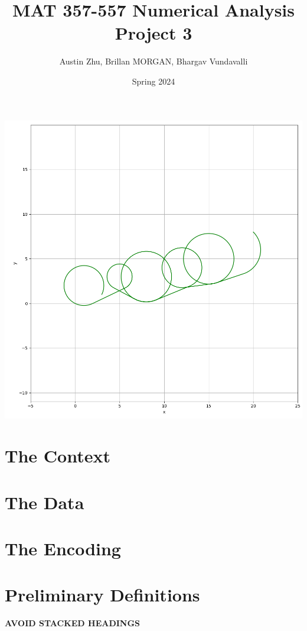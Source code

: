 \documentclass{article}
\title{MAT 357-557 Numerical Analysis Project 3}
\author{Austin Zhu, Brillan MORGAN, Bhargav Vundavalli}
\date{Spring 2024}
\begin{document}
\maketitle

\begin{center}
\includegraphics[width=1.0\linewidth]{Plots/CoverPlot.png}
\newpage
\end{center}



\section{The Context}

\section{The Data}

\section{The Encoding}

\section{Preliminary Definitions}
\textbf{AVOID STACKED HEADINGS}
\end{document}
